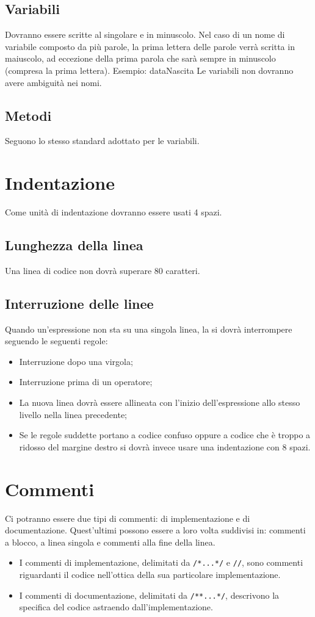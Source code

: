 \subsection{Variabili}
Dovranno essere scritte al singolare e in minuscolo. Nel caso di un nome di variabile composto da pi\`u parole, la prima lettera delle parole verr\`a scritta in maiuscolo, ad eccezione della prima parola che sar\`a sempre in minuscolo (compresa la prima lettera). \newline
Esempio: dataNascita \newline
Le variabili non dovranno avere ambiguit\`a nei nomi.
\subsection{Metodi}
Seguono lo stesso standard adottato per le variabili.

\section{Indentazione}
Come unit\`a di indentazione dovranno essere usati 4 spazi.
\subsection{Lunghezza della linea}
Una linea di codice non dovr\`a superare 80 caratteri.
\subsection{Interruzione delle linee}
Quando un'espressione non sta su una singola linea, la si dovr\`a interrompere seguendo le seguenti regole:
\begin{itemize}
\item Interruzione dopo una virgola;
\item Interruzione prima di un operatore;
\item La nuova linea dovr\`a essere allineata con l'inizio dell'espressione allo stesso livello nella linea precedente;
\item Se le regole suddette portano a codice confuso oppure a codice che è troppo a ridosso del margine destro si dovr\`a invece usare una indentazione con 8 spazi.
\end{itemize}


\section{Commenti}
Ci potranno essere due tipi di commenti: di implementazione e di documentazione. Quest'ultimi possono essere a loro volta suddivisi in: commenti a blocco, a linea singola e commenti alla fine della linea.
\begin{itemize}
\item I commenti di implementazione, delimitati da \texttt{/*...*/} e \texttt{//}, sono commenti riguardanti il codice nell'ottica della sua particolare implementazione.
\item I commenti di documentazione, delimitati da \texttt{/**...*/}, descrivono la specifica del codice astraendo dall'implementazione.
\end{itemize}
